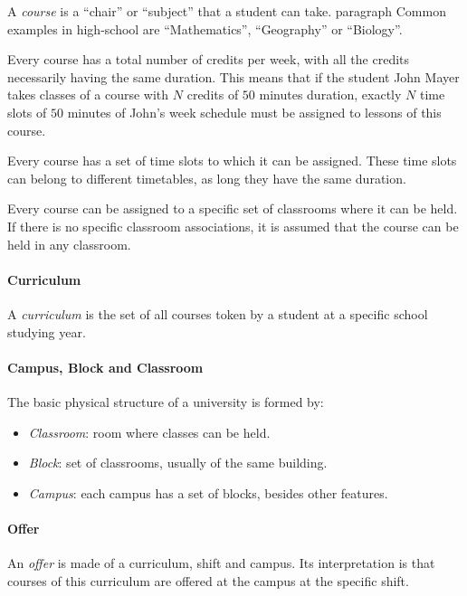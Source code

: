 A \textit{course} is a ``chair'' or ``subject'' that a student can take.
paragraph
Common examples in high-school are ``Mathematics'', ``Geography'' or ``Biology''.

Every course has a total number of credits per week, with all the credits necessarily having the same duration. This means that if the student John Mayer takes classes of a course with $N$ credits of $50$ minutes duration, exactly $N$ time slots of $50$ minutes of John's week schedule must be assigned to lessons of this course.

Every course has a set of time slots to which it can be assigned. These time slots can belong to different timetables, as long they have the same duration.

Every course can be assigned to a specific set of classrooms where it can be held. If there is no specific classroom associations, it is assumed that the course can be held in any classroom.


\paragraph{Curriculum}
\label{defcurric}

A \textit{curriculum} is the set of all courses token by a student at a specific school studying year.


\paragraph{Campus, Block and Classroom}
\label{defclassroom}

The basic physical structure of a university is formed by:
\begin{itemize}
\item \textit{Classroom}: room where classes can be held.
\item \textit{Block}: set of classrooms, usually of the same building.
\item \textit{Campus}: each campus has a set of blocks, besides other features.
\end{itemize}


\paragraph{Offer}
\label{defoffer}
 
An \textit{offer} is made of a curriculum, shift and campus. Its interpretation is that courses of this curriculum are offered at the campus at the specific shift.



